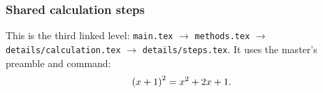 \subsubsection{Shared calculation steps}
This is the third linked level:
\texttt{main.tex} $\to$ \texttt{methods.tex} $\to$
\texttt{details/calculation.tex} $\to$ \texttt{details/steps.tex}.
It uses the master's preamble and command:
\[
  \left(x+1\right)^2=x^2+2x+1.
\]
